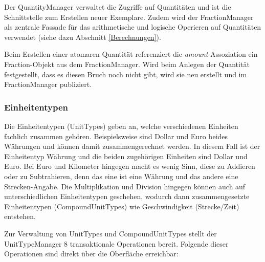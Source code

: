 \label{QuantityManager}

Der QuantityManager verwaltet die Zugriffe auf Quantitäten und ist die Schnittstelle zum Erstellen neuer Exemplare.
Zudem wird der FractionManager als zentrale Fassade für das arithmetische und logische Operieren auf Quantitäten verwendet (siehe dazu Abschnitt \ref{Berechnungen}).

Beim Erstellen einer atomaren Quantität referenziert die \textit{amount}-Assoziation ein Fraction-Objekt aus dem FractionManager. Wird beim Anlegen der Quantität festgestellt, dass es diesen Bruch noch nicht gibt,
wird sie neu erstellt und im FractionManager publiziert. 

\subsubsection{Einheitentypen}
Die Einheitentypen (UnitTypes) geben an, welche verschiedenen Einheiten fachlich zusammen gehören. Beispielsweise sind Dollar und Euro beides Währungen und können damit zusammengerechnet werden. In diesem Fall ist der Einheitentyp Währung und die beiden zugehörigen Einheiten sind Dollar und Euro. Bei Euro und Kilometer hingegen macht es wenig Sinn, diese zu Addieren oder zu Subtrahieren, denn das eine ist eine Währung und das andere eine Strecken-Angabe. Die Multiplikation und Division hingegen können auch auf unterschiedlichen Einheitentypen geschehen, wodurch dann zusammengesetzte Einheitentypen (CompoundUnitTypes) wie Geschwindigkeit (Strecke/Zeit) entstehen.

Zur Verwaltung von UnitTypes und CompoundUnitTypes stellt der UnitTypeManager 8 transaktionale Operationen bereit. Folgende dieser Operationen sind direkt über die Oberfläche erreichbar:

